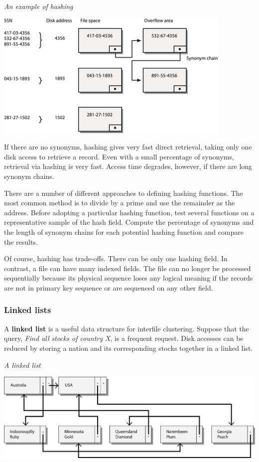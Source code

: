 \documentclass[
]{article}
\begin{document}
\emph{An example of hashing}

\includegraphics{Figures/Chapter 20/hashing.png}

If there are no synonyms, hashing gives very fast direct retrieval,
taking only one disk access to retrieve a record. Even with a small
percentage of synonyms, retrieval via hashing is very fast. Access time
degrades, however, if there are long synonym chains.

There are a number of different approaches to defining hashing
functions. The most common method is to divide by a prime and use the
remainder as the address. Before adopting a particular hashing function,
test several functions on a representative sample of the hash field.
Compute the percentage of synonyms and the length of synonym chains for
each potential hashing function and compare the results.

Of course, hashing has trade-offs. There can be only one hashing field.
In contrast, a file can have many indexed fields. The file can no longer
be processed sequentially because its physical sequence loses any
logical meaning if the records are not in primary key sequence or are
sequenced on any other field.

\hypertarget{linked-lists}{%
\subsubsection*{Linked lists}\label{linked-lists}}

A \textbf{linked list} is a useful data structure for interfile clustering.
Suppose that the query, \emph{Find all stocks of country X}, is a frequent
request. Disk accesses can be reduced by storing a nation and its
corresponding stocks together in a linked list.

\emph{A linked list}

\includegraphics{Figures/Chapter 20/linked.png}
\end{document}
